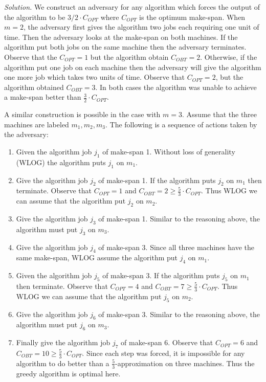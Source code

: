 \documentclass[11pt]{article}
\begin{document}
\begin{enumerate}
\emph{Solution.} We construct an adversary for any algorithm which forces the output of the algorithm to be $3/2 \cdot C_{OPT}$ where $C_{OPT}$ is the optimum make-span. When $m = 2$, the adversary first gives the algorithm two jobs each requiring one unit of time. Then the adversary looks at the make-span on both machines. If the algorithm put both jobs on the same machine then the adversary terminates. Observe that the $C_{OPT} = 1$ but the algorithm obtain $C_{OBT} = 2$. Otherwise, if the algorithm put one job on each machine then the adversary will give the algorithm one more job which takes two units of time. Observe that $C_{OPT} = 2$, but the algorithm obtained $C_{OBT} = 3$. In both cases the algorithm was unable to achieve a make-span better than $\frac{3}{2} \cdot C_{OPT}$. 

A similar construction is possible in the case with $m = 3$. Assume that the three machines are labeled $m_1, m_2, m_3$. The following is a sequence of actions taken by the adversary:
\begin{enumerate}
\item Given the algorithm job $j_1$ of make-span 1. Without loss of generality (WLOG) the algorithm puts $j_1$ on $m_1$.
\item Give the algorithm job $j_2$ of make-span 1. If the algorithm puts $j_2$ on $m_1$ then terminate. Observe that $C_{OPT} = 1$ and $C_{OBT} = 2 \geq \frac{5}{3}\cdot C_{OPT}$. Thus WLOG we can assume that the algorithm put $j_2$ on $m_2$.
\item Give the algorithm job $j_3$ of make-span 1. Similar to the reasoning above, the algorithm must put $j_3$ on $m_3$.
\item Give the algorithm job $j_4$ of make-span 3. Since all three machines have the same make-span, WLOG assume the algorithm put $j_4$ on $m_1$. 
\item Given the algorithm job $j_5$ of make-span 3. If the algorithm puts $j_5$ on $m_1$ then terminate. Observe that $C_{OPT} = 4$ and $C_{OBT} = 7 \geq \frac{5}{3} \cdot C_{OPT}$. Thus WLOG we can assume that the algorithm put $j_5$ on $m_2$.
\item Give the algorithm job $j_6$ of make-span 3. Similar to the reasoning above, the algorithm must put $j_6$ on $m_3$.
\item Finally give the algorithm job $j_7$ of make-span 6. Observe that $C_{OPT} = 6$ and $C_{OBT} = 10 \geq \frac{5}{3} \cdot C_{OPT}$. Since each step was forced, it is impossible for any algorithm to do better than a $\frac{5}{3}$-approximation on three machines. Thus the greedy algorithm is optimal here.
\end{enumerate}


\end{enumerate}
\end{document}
